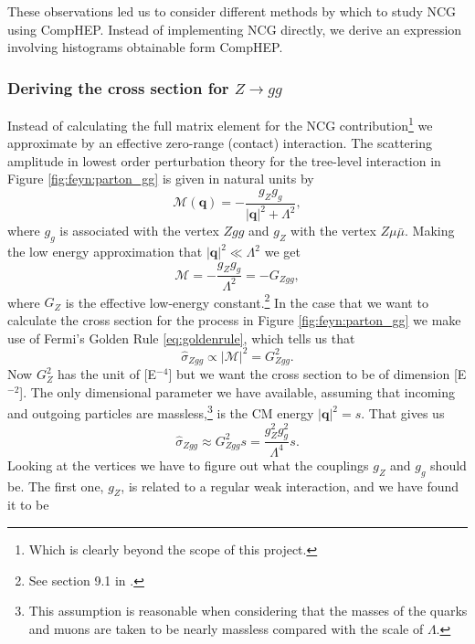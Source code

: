 These observations led us to consider different methods by which to study NCG using CompHEP. Instead of implementing NCG directly, we derive an expression involving histograms obtainable form CompHEP.

\subsubsection{Deriving the cross section for $Z \rightarrow gg$} \label{sec:derivcrosssection}
Instead of calculating the full matrix element for the NCG contribution\footnote{Which is clearly beyond the scope of this project.} we approximate by an effective zero-range (contact) interaction. The scattering amplitude in lowest order perturbation theory for the tree-level interaction in Figure \ref{fig:feyn:parton_gg} is given in natural units by
\begin{equation}
	\mathcal{M}(\mathbf{q}) = -\frac{g_Z g_g }{|\mathbf{q}|^2 + \Lambda^2},
\end{equation}
where $g_g$ is associated with the vertex $Zgg$ and $g_Z$ with the vertex $Z\mu \bar \mu$. Making the low energy approximation that $|\mathbf{q}|^2 \ll \Lambda^2$ we get
\begin{equation} \label{eq:scatteringamplitude}
	\mathcal{M} = -\frac{g_Z g_g}{\Lambda^2} = -G_{Zgg},
\end{equation}
where $G_Z$ is the effective low-energy constant.\footnote{See section 9.1 in \cite{martin1998pp}.} In the case that we want to calculate the cross section for the process in Figure \ref{fig:feyn:parton_gg} we make use of Fermi's Golden Rule \eqref{eq:goldenrule}, which tells us that
\begin{equation}
	\hat \sigma_{Zgg} \propto |\mathcal{M}|^2 = G_{Zgg}^2.
\end{equation}
Now $G_Z^2$ has the unit of [E$^{-4}$] but we want the cross section to be of dimension [E$^{-2}$]. The only dimensional parameter we have available, assuming that incoming and outgoing particles are massless,\footnote{This assumption is reasonable when considering that the masses of the quarks and muons are taken to be nearly massless compared with the scale of $\Lambda$.} is the CM energy $|\mathbf{q}|^2 = s$. That gives us
\begin{equation} \label{eq:goldenrule2}
	\hat \sigma_{Zgg} \approx G_{Zgg}^2 s = \frac{g_Z^2 g_g^2}{\Lambda^4}s.
\end{equation}
Looking at the vertices we have to figure out what the couplings $g_Z$ and $g_g$ should be. The first one, $g_Z$, is related to a regular weak interaction, and we have found it to be \cite{bettini2008iep}
